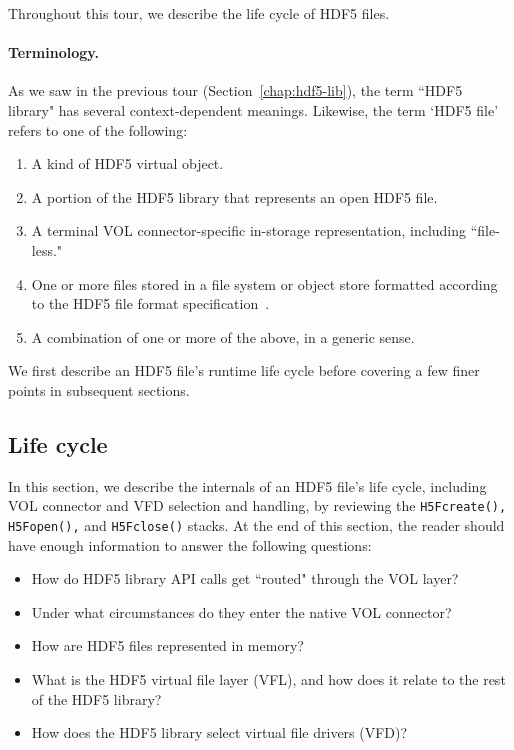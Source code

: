 


Throughout this tour, we describe the life cycle of HDF5 files.

\paragraph{Terminology.} As we saw in the previous tour (Section~\ref{chap:hdf5-lib}), the term ``HDF5 library" has several context-dependent meanings. Likewise, the term `HDF5 file' refers to one of the following:

\begin{enumerate}
    \item A kind of HDF5 virtual object.
    \item A portion of the HDF5 library that represents an open HDF5 file.
    \item A terminal VOL connector-specific in-storage representation, including ``file-less."
    \item One or more files stored in a file system or object store formatted according to the HDF5 file format specification~\cite{ffmt}.
    \item A combination of one or more of the above, in a generic sense.
\end{enumerate}

We first describe an HDF5 file’s runtime life cycle before covering a few finer points in subsequent sections.

\subsection{Life cycle}

In this section, we describe the internals of an HDF5 file's life cycle, including VOL connector and VFD selection and handling, by reviewing the \texttt{H5Fcreate(), H5Fopen(),} and \texttt{H5Fclose()} stacks. At the end of this section, the reader should have enough information to answer the following questions:

\begin{itemize}
    \item How do HDF5 library API calls get ``routed" through the VOL layer?
    \item Under what circumstances do they enter the native VOL connector?
    \item How are HDF5 files represented in memory?
    \item What is the HDF5 virtual file layer (VFL), and how does it relate to the rest of the HDF5 library?
    \item How does the HDF5 library select virtual file drivers (VFD)?
\end{itemize}

